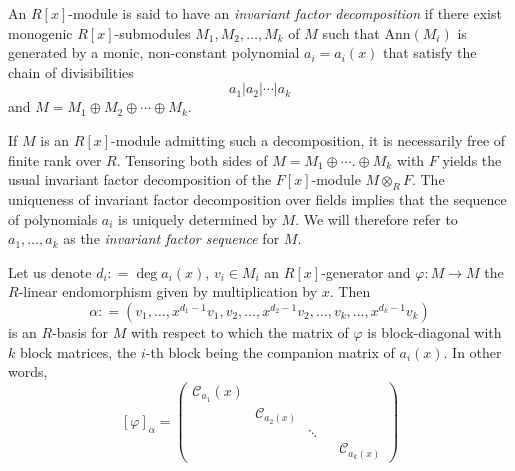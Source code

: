 \documentclass[ALCO, Unicode]{cedram}
\begin{document}
\begin{definition} An $ R[x]$-module is  said to have an \textit{invariant factor decomposition} if there exist monogenic $ R[x]$-submodules   $ M_{1} ,  M_{2} ,  \ldots,  M_{k}   $ of $ M  $  such that  $ \mathrm{Ann}(M_{i}) $ is generated by a monic, non-constant polynomial $  a_{i} = a_{i}(x) $ that satisfy the chain of divisibilities $$  a_{1} |  a_{2}  |            \cdots  |  a_{k}       $$            
and  $  M    =   M_{1}     \oplus   M_{2}   \oplus    \cdots   \oplus      M_{k}            $. 
\end{definition} 

If  $ M $ is an $R[x]$-module admitting such a decomposition, it is necessarily free of finite rank over $ R $.   Tensoring  both  sides       of     $ M = M_{1} \oplus  \cdots. \oplus   M_{k} $ with $ F $ yields the usual invariant factor decomposition of the $ F[x] $-module $ M \otimes_{R} F $. The uniqueness of invariant factor decomposition over fields implies that the sequence  of   polynomials $ a_{i}  $ is uniquely determined by $ M  $. We will therefore  refer to $ a_{1}, \ldots, a_{k} $ as  the \emph{invariant factor sequence}  for $ M $.  
 
Let us denote  $    d_{i}  : =     \deg   a_{i}(x)  $, $ v_{i} \in M_i$ an $ R[x]$-generator and $ \varphi : M \to M $ the $ R $-linear endomorphism given by multiplication by $ x $. Then $$           \alpha            : =   ( v_{1} ,  \ldots,  x ^ { d_{1}    - 1 } v_{1} ,  v_{2}  , \ldots,   x ^{ d_{2} - 1}  v_{2} ,  \ldots ,   v_{k}  , \ldots ,         x ^ { d_{k} -1 } v_{k}  )   $$ is an $ R $-basis for $  M  $ with respect to which the matrix of $ \varphi $ is block-diagonal with $ k $ block matrices, the $  i $-th block being the companion matrix of $ a_{i}(x) $. In other words,                                                                   
\begin{equation} \label{xalpha}    [\varphi]_{\alpha}  = \begin{pmatrix}    \mathcal{C}_{a_{1}}(x)  &   &    &    \\ 
                                                                            &    \mathcal{C}_{a_{2}(x)} &    &      &       \\ 
                                                                                                                          &    &    \ddots    &  &      \\
                                                             &                       &                                      &  &        \mathcal{C}_{a_{k}(x)}      
\end{pmatrix} 
\end{equation}  
\end{document}
